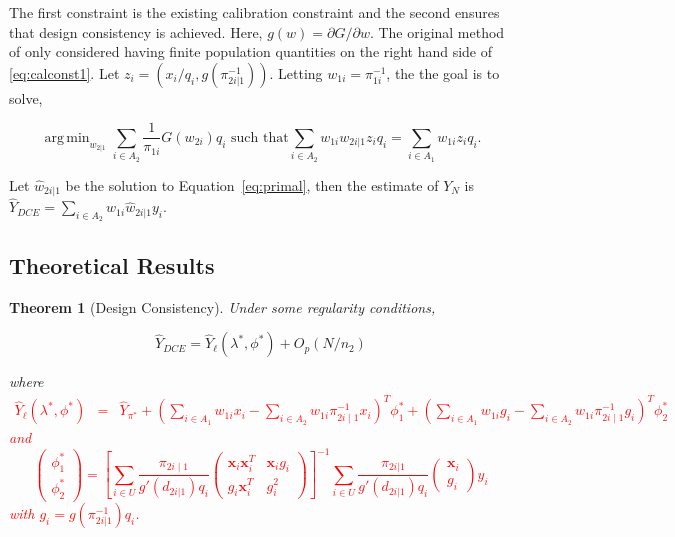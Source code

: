 \documentclass[12pt]{article}
\newtheorem{theorem}{Theorem}
\DeclareMathOperator*{\argmin}{arg\,min}
\newcommand{\bx}{\mathbf{x}}
\begin{document}
The first constraint is the existing calibration constraint and the second
ensures that design consistency is achieved. Here, 
$g(w) = \partial G / \partial w$. 
The original method of \cite{kwon2024debiased} only considered having finite
population quantities on the right hand side of \ref{eq:calconst1}.
Let $z_i = (x_i / q_i, g(\pi_{2i|1}^{-1}))$. Letting $w_{1i} = \pi_{1i}^{-1}$,
the the goal is to solve,

\begin{equation}\label{eq:primal}
  \argmin_{w_{2|1}} \sum_{i \in A_2} \frac{1}{\pi_{1i}} G(w_{2i}) q_i 
  \text{ such that}
  \sum_{i \in A_2} w_{1i} w_{2i|1} z_i q_i = \sum_{i \in A_1} w_{1i} z_i q_i.
\end{equation}

Let $\hat w_{2i|1}$ be the solution to Equation~\ref{eq:primal}, then the
estimate of $Y_N$ is $\hat Y_{DCE} = \sum_{i \in A_2} w_{1i} \hat w_{2i|1} y_i$.


\subsection{Theoretical Results}

\begin{theorem}[Design Consistency]
  Under some regularity conditions,

  $$\hat Y_{DCE} = \hat Y_\ell(\lambda^*, \phi^*) + O_p(N / n_2)$$

  where
\textcolor{red}{
   \begin{eqnarray*}
   \hat Y_{\ell}( \lambda^*, \phi^*) &=&   \hat{Y}_{\pi^*} + 
  \left(\sum_{i \in A_1} w_{1i} x_i  -  \sum_{i \in A_2} w_{1i} \pi_{2i \mid 1}^{-1} x_i  \right)^T \phi_1^* + \left(\sum_{i \in A_1} w_{1i} g_i   -  \sum_{i \in A_2} w_{1i} \pi_{2i \mid 1}^{-1}g_i  \right)^T \phi_2^*  
  \end{eqnarray*} 
  and  $$\begin{pmatrix}
  \phi_1^* \\
  \phi_2^* 
  \end{pmatrix}
  = \left[ \sum_{i \in U} \frac{\pi_{2i \mid 1} }{ g'(d_{2i|1}) q_i} 
  \begin{pmatrix}
  \bx_i \bx_i^T &   \bx_i g_i   \\
  g_i  \bx_i^T   & g_i^2     \end{pmatrix} \right]^{-1}
  \sum_{i \in U} \frac{\pi_{2i|1}}{ g'(d_{2i | 1}) q_i} \begin{pmatrix}
    \bx_i \\ g_i 
  \end{pmatrix}y_i $$
with $g_i = g( \pi_{2i |1}^{-1}) q_i$. }
\end{theorem}
\end{document}
